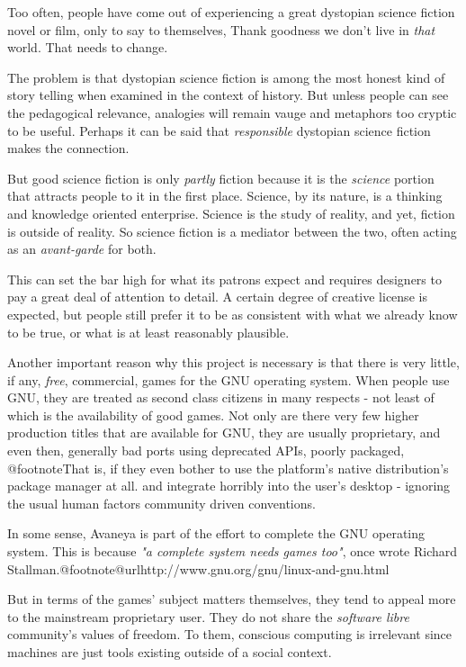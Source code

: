 
Too often, people have come out of experiencing a great dystopian science fiction novel or film, only to say to themselves, Thank goodness we don't live in {\sl that} world. That needs to change.

The problem is that dystopian science fiction is among the most honest kind of story telling when examined in the context of history. But unless people can see the pedagogical relevance, analogies will remain vauge and metaphors too cryptic to be useful. Perhaps it can be said that {\sl responsible} dystopian science fiction makes the connection.

But good science fiction is only {\sl partly} fiction because it is the {\sl science} portion that attracts people to it in the first place. Science, by its nature, is a thinking and knowledge oriented enterprise. Science is the study of reality, and yet, fiction is outside of reality. So science fiction is a mediator between the two, often acting as an {\sl avant-garde} for both.

This can set the bar high for what its patrons expect and requires designers to pay a great deal of attention to detail. A certain degree of creative license is expected, but people still prefer it to be as consistent with what we already know to be true, or what is at least reasonably plausible.

Another important reason why this project is necessary is that there is very little, if any, {\sl free}, commercial, games for the GNU operating system. When people use GNU, they are treated as second class citizens in many respects - not least of which is the availability of good games. Not only are there very few higher production titles that are available for GNU, they are usually proprietary, and even then, generally bad ports using deprecated APIs, poorly packaged, @footnote{That is, if they even bother to use the platform's native distribution's package manager at all.} and integrate horribly into the user's desktop - ignoring the usual human factors community driven conventions.

In some sense, Avaneya is part of the effort to complete the GNU operating system. This is because {\sl "a complete system needs games too"}, once wrote Richard Stallman.@footnote{@url{http://www.gnu.org/gnu/linux-and-gnu.html}}

But in terms of the games' subject matters themselves, they tend to appeal more to the mainstream proprietary user. They do not share the {\sl software libre} community's values of freedom. To them, conscious computing is irrelevant since machines are just tools existing outside of a social context. 

